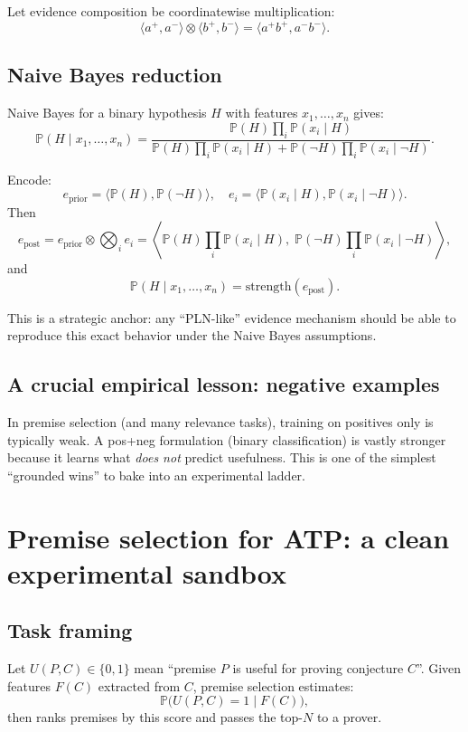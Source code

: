 \documentclass[11pt]{article}
\newcommand{\Prob}{\mathbb{P}}
\begin{document}
Let evidence composition be coordinatewise multiplication:
\[
\langle a^+,a^- \rangle \otimes \langle b^+,b^- \rangle
= \langle a^+b^+, a^-b^- \rangle.
\]

\subsection{Naive Bayes reduction}

Naive Bayes for a binary hypothesis $H$ with features $x_1,\dots,x_n$ gives:
\[
\Prob(H \mid x_1,\dots,x_n)
=
\frac{\Prob(H)\prod_i \Prob(x_i\mid H)}
{\Prob(H)\prod_i \Prob(x_i\mid H) + \Prob(\neg H)\prod_i \Prob(x_i\mid \neg H)}.
\]

Encode:
\[
e_{\mathrm{prior}}=\langle \Prob(H),\Prob(\neg H)\rangle,\quad
e_i=\langle \Prob(x_i\mid H),\Prob(x_i\mid \neg H)\rangle.
\]
Then
\[
e_{\mathrm{post}} = e_{\mathrm{prior}} \otimes \bigotimes_i e_i
=
\left\langle
\Prob(H)\prod_i \Prob(x_i\mid H),\;
\Prob(\neg H)\prod_i \Prob(x_i\mid \neg H)
\right\rangle,
\]
and
\[
\Prob(H\mid x_1,\dots,x_n) = \mathrm{strength}(e_{\mathrm{post}}).
\]

This is a strategic anchor: any ``PLN-like'' evidence mechanism should be able to reproduce this exact behavior
under the Naive Bayes assumptions.

\subsection{A crucial empirical lesson: negative examples}

In premise selection (and many relevance tasks), training on positives only is typically weak.
A pos+neg formulation (binary classification) is vastly stronger because it learns what \emph{does not} predict usefulness.
This is one of the simplest ``grounded wins'' to bake into an experimental ladder.

\section{Premise selection for ATP: a clean experimental sandbox}

\subsection{Task framing}

Let $U(P,C)\in\{0,1\}$ mean ``premise $P$ is useful for proving conjecture $C$''.
Given features $F(C)$ extracted from $C$, premise selection estimates:
\[
\Prob\big(U(P,C)=1\mid F(C)\big),
\]
then ranks premises by this score and passes the top-$N$ to a prover.
\end{document}
